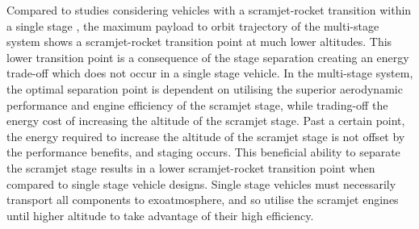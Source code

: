 \documentclass[]{aiaa-tc}
\begin{document}
 
 Compared to studies considering vehicles with a scramjet-rocket transition within a single stage \cite{Lu1993}\cite{Trefny1999}, the maximum payload to orbit trajectory of the multi-stage system shows a scramjet-rocket transition point at much lower altitudes. This lower transition point is a consequence of the stage separation creating an energy trade-off which does not occur in a single stage vehicle. In the multi-stage system, the optimal separation point is dependent on utilising the superior aerodynamic performance and engine efficiency of the scramjet stage, while trading-off the energy cost of increasing the altitude of the scramjet stage. Past a certain point, the energy required to increase the altitude of the scramjet stage is not offset by the performance benefits, and staging occurs. This beneficial ability to separate the scramjet stage results in a  lower scramjet-rocket transition point when compared to single stage vehicle designs. Single stage vehicles must necessarily transport all components to exoatmosphere, and so utilise the scramjet engines until higher altitude to take advantage of their high efficiency.
\end{document}

